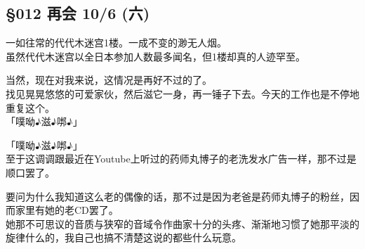 \subsection{§012 再会 10/6 (六)}

一如往常的代代木迷宫1楼。一成不变的渺无人烟。\\

虽然代代木迷宫以全日本参加人数最多闻名，但1楼却真的人迹罕至。

当然，现在对我来说，这情况是再好不过的了。\\

找见晃晃悠悠的可爱家伙，然后滋它一身，再一锤子下去。今天的工作也是不停地重复这个。\\

「噗呦♪滋♪𠳐♪」

「噗呦♪滋♪𠳐♪」\\

至于这调调跟最近在Youtube上听过的药师丸博子的老洗发水广告一样，那不过是顺口罢了。

要问为什么我知道这么老的偶像的话，那不过是因为老爸是药师丸博子的粉丝，因而家里有她的老CD罢了。\\

她那不可思议的音质与狭窄的音域令作曲家十分的头疼、渐渐地习惯了她那平淡的旋律什么的，我自己也搞不清楚这说的都些什么玩意。\\

